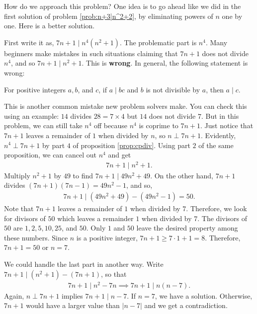 \documentclass{subfile}
\begin{document}
		\begin{solution}
			How do we approach this problem? One idea is to go ahead like we did in the first solution of problem \eqref{prob:n+3|n^2+2}, by eliminating powers of $n$ one by one. Here is a better solution.

			First write it as, $7n+1 \mid n^4(n^2+1)$. The problematic part is $n^4$. Many beginners make mistakes in such situations claiming that $7n+1$ does not divide $n^4$, and so $7n+1 \mid n^2+1$. This is \textbf{wrong}. In general, the following statement is wrong:
			\begin{displayquote}
				For positive integers $a,b$, and $c$, if $a\mid bc$ and $b$ is not divisible by $a$, then $a\mid c$.
			\end{displayquote}
			This is another common  mistake new problem solvers make. You can check this using an example: $14$ divides $28=7\times4$ but $14$ does not divide $7$. But in this problem, we can still take $n^4$ off because $n^4$ is coprime to $7n+1$. Just notice that $7n+1$ leaves a remainder of $1$ when divided by $n$, so $n\perp7n+1$. Evidently, $n^4\perp7n+1$ by part $4$ of proposition \eqref{prop:cpdiv}. Using part $2$ of the same proposition, we can cancel out $n^4$ and get
				\begin{align*}
					7n+1  \mid n^2+1.
				\end{align*}
			Multiply $n^2+1$ by $49$ to find $ 7n+1 \mid 49n^2+49$. On the other hand, $7n+1$ divides $(7n+1)(7n-1)=49n^2-1$, and so,
				\begin{align*}
					7n+1 \mid (49n^2+49)-(49n^2-1) = 50.
				\end{align*}
			Note that $7n+1$ leaves a remainder of $1$ when divided by $7$. Therefore, we look for divisors of $50$ which leaves a remainder $1$ when divided by $7$. The divisors of $50$ are $1,2,5,10,25$, and $50$. Only $1$ and $50$ leave the desired property among these numbers. Since $n$ is a positive integer, $7n+1\geq7\cdot1+1=8$. Therefore, $7n+1=50$ or $n=7$.
		\end{solution}

		\begin{remark}
			We could handle the last part in another way. Write $7n+1\mid (n^2+1)-(7n+1)$, so that
				\begin{align*}
					7n+1  \mid n^2-7n \implies 7n+1\mid  n(n-7).
				\end{align*}
			Again, $n\perp7n+1$ implies $7n+1\mid n-7$. If $n=7$, we have a solution. Otherwise, $7n+1$ would have a larger value than $|n-7|$ and we get a contradiction.
		\end{remark}
\end{document}
